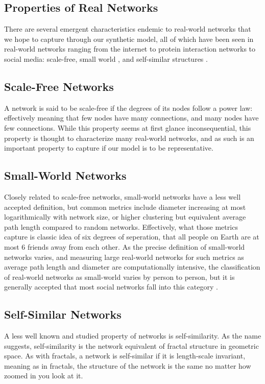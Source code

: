 \documentclass[12pt,twoside]{report}
\begin{document}
\subsection{Properties of Real Networks}

There are several emergent characteristics endemic to real-world networks that we hope to capture through our synthetic model, all of which have been seen in real-world networks ranging from the internet to protein interaction networks to social media: scale-free, small world \cite{wang2003complex}, and self-similar structures \cite{song2005self}. \\

\subsection{Scale-Free Networks}
A network is said to be scale-free if the degrees of its nodes follow a power law: effectively meaning that few nodes have many connections, and many nodes have few connections. While this property seems at first glance inconsequential, this property is thought to characterize many real-world networks, and as such is an important property to capture if our model is to be representative.  \\

\subsection{Small-World Networks}
Closely related to scale-free networks, small-world networks have a less well accepted definition, but common metrics include diameter increasing at most logarithmically with network size, or higher clustering but equivalent average path length compared to random networks. Effectively, what those metrics capture is classic idea of six degrees of seperation, that all people on Earth are at most 6 friends away from each other. As the precise definition of small-world networks varies, and measuring large real-world networks for such metrics as average path length and diameter are computationally intensive, the classification of real-world networks as small-world varies by person to person, but it is generally accepted that most social networks fall into this category \cite{telesford2011ubiquity}. \\

\subsection{Self-Similar Networks}
A less well known and studied property of networks is self-similarity. As the name suggests, self-similarity is the network equivalent of fractal structure in geometric space. As with fractals, a network is self-similar if it is length-scale invariant, meaning as in fractals, the structure of the network is the same no matter how zoomed in you look at it. \\
\end{document}
